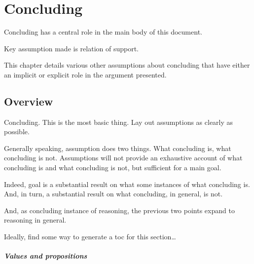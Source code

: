 \chapter{Concluding}
\label{chapter:concluding}

\begin{note}
  Concluding has a central role in the main body of this document.

  Key assumption made is relation of support.

  This chapter details various other assumptions about concluding that have either an implicit or explicit role in the argument presented.
\end{note}

\section{Overview}
\label{sec:concluding:overview}

\begin{note}[Overview]
  Concluding.
  This is the most basic thing.
  Lay out assumptions as clearly as possible.

  Generally speaking, assumption does two things.
  What concluding is, what concluding is not.
  Assumptions will not provide an exhaustive account of what concluding is and what concluding is not, but sufficient for a main goal.

  Indeed, goal is a substantial result on what some instances of what concluding is.
  And, in turn, a substantial result on what concluding, in general, is not.

  And, as concluding instance of reasoning, the previous two points expand to reasoning in general.
\end{note}

\begin{note}
  Ideally, find some way to generate a toc for this section\dots
\end{note}


\paragraph*{Values and propositions}

